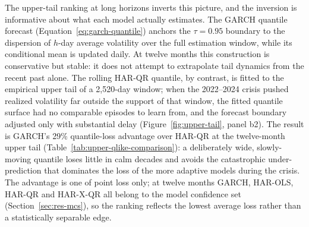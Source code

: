 The upper-tail ranking at long horizons inverts this picture, and the
inversion is informative about what each model actually estimates. The
GARCH quantile forecast (Equation~\ref{eq:garch-quantile}) anchors the
$\tau = 0.95$ boundary to the dispersion of $h$-day average volatility
over the full estimation window, while its conditional mean is updated
daily. At twelve months this construction is conservative but stable: it
does not attempt to extrapolate tail dynamics from the recent past alone.
The rolling HAR-QR quantile, by contrast, is fitted to the empirical
upper tail of a 2,520-day window; when the 2022--2024 crisis pushed
realized volatility far outside the support of that window, the fitted
quantile surface had no comparable episodes to learn from, and the
forecast boundary adjusted only with substantial delay
(Figure~\ref{fig:upper-tail}, panel b2). The result is GARCH's 29\%
quantile-loss advantage over HAR-QR at the twelve-month upper tail
(Table~\ref{tab:upper-qlike-comparison}): a deliberately wide,
slowly-moving quantile loses little in calm decades and avoids the
catastrophic under-prediction that dominates the loss of the more
adaptive models during the crisis. The advantage is one of point loss
only; at twelve months GARCH, HAR-OLS, HAR-QR and HAR-X-QR all belong to
the model confidence set (Section~\ref{sec:res-mcs}), so the ranking
reflects the lowest average loss rather than a statistically separable
edge.

